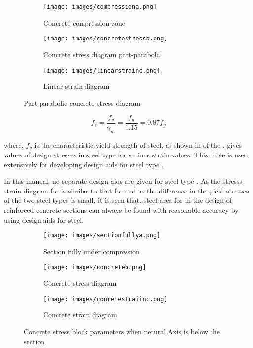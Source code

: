 \begin{figure}
\begin{subfigure}{0.3\textwidth}
\centering
\texttt{[image: images/compressiona.png]}
\caption{Concrete compression zone}
\label{fig:compression}
\end{subfigure}
%
\begin{subfigure}{0.3\textwidth}
\centering
\texttt{[image: images/concretestressb.png]}
\caption{Concrete stress diagram part-parabola}
\label{fig:stress}
\end{subfigure}
%
\begin{subfigure}{0.3\textwidth}
\centering
\texttt{[image: images/linearstrainc.png]}
\caption{Linear strain diagram}
\label{fig:strain}
\end{subfigure}
\caption{Part-parabolic concrete stress diagram}
\label{fig:part}
\end{figure}

\begin{equation}
f_s=\frac{f_y}{\gamma_m}=\frac{f_y}{1.15}=0.87f_y
\end{equation}

where, $f_y$ is the characteristic yield strength of steel, as shown in
 of the .  gives values of design
stresses in steel type {\fefouronefive} for various strain values.
This table is used extensively for developing design aids for steel
type {\fefouronefive}. 

In this manual, no separate design aids are given
for steel type {\fefivezerozero}. As the stresss-strain diagram for
{\fefivezerozero} is similar to that for {\fefouronefive} and as the difference in the yield stresses of the two steel types is small, it is seen that. 
steel area for {\fefivezerozero}  in the design of reinforced concrete 
sections can always be found with reasonable accuracy by using design
aids for steel.

\begin{figure}
\centering
\begin{subfigure}{0.3\textwidth}
\centering
\texttt{[image: images/sectionfullya.png]}
\caption{Section fully under compression}
\label{fig:section}
\end{subfigure}
%
\begin{subfigure}{0.3\textwidth}
\centering
\texttt{[image: images/concreteb.png]}
\caption{Concrete stress diagram}
\label{fig:sec}
\end{subfigure}
%
\begin{subfigure}{0.3\textwidth}
\centering
\texttt{[image: images/conretestraiinc.png]}
\caption{Concrete strain diagram}
\label{fig:con}
\end{subfigure}
\caption{Concrete stress block parameters when netural Axis is below the section}
\label{fig:block}
\end{figure}

